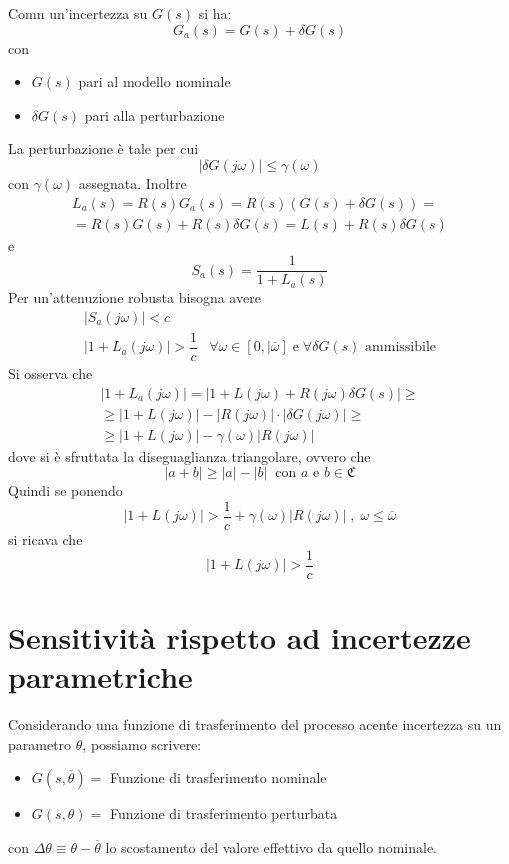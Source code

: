 \documentclass[a4paper]{report}
\begin{document}
Comn un'incertezza su $G(s)$ si ha:
\[
G_a(s) = G(s) + \delta G(s)
\]
con
\begin{itemize}
\item $G(s)$ pari al modello nominale
\item $\delta G(s)$ pari alla perturbazione
\end{itemize}
La perturbazione \`e tale per cui
\[
|\delta G(j \omega)| \leq \gamma(\omega)
\]
con $\gamma(\omega)$ assegnata. Inoltre
\[
\begin{array}{l}
L_a(s) = R(s) G_a(s) = R(s) (G(s) + \delta G(s)) =\\
= R(s)G(s) + R(s)\delta G(s) = L(s) + R(s)\delta G(s)
\end{array}
\]
e
\[
S_a(s) = \dfrac{1}{1 + L_a(s)}
\]
Per un'attenuzione robusta bisogna avere
\[
\begin{array}{ll}
  |S_a(j \omega)| < c & \\
  |1 + L_a(j \omega)| > \dfrac{1}{c} & \forall \omega \in [0,
  |\overline{\omega}]\;\textrm{e}\;\forall \delta G(s) \textrm{ ammissibile}
\end{array}
\]
Si osserva che
\[
\begin{array}{l}
  |1 + L_a(j \omega)| = |1 + L(j \omega) + R(j \omega) \delta G(s)|
  \geq\\
  \geq |1 + L(j \omega)| - |R(j \omega)|\cdot|\delta G(j \omega)|
  \geq\\
  \geq |1 + L(j \omega)| - \gamma(\omega) |R(j \omega)|
\end{array}
\]
dove si \`e sfruttata la diseguaglianza triangolare, ovvero che
\[
| a + b | \geq |a| - |b| \;\; \textrm{con } a \textrm{ e } b \in
\mathfrak{C}
\]
Quindi se ponendo
\[
|1 + L(j \omega)| > \dfrac{1}{c} + \gamma(\omega) |R(j \omega)| \;,\;
\omega \leq \overline{\omega}
\]
si ricava che
\[
|1 + L(j \omega)| > \dfrac{1}{c}
\]

\section{Sensitivit\`a rispetto ad incertezze parametriche}
Considerando una funzione di trasferimento del processo acente
incertezza su un parametro $\theta$, possiamo scrivere:
\begin{itemize}
\item $G(s, \overline{\theta}) = $ Funzione di trasferimento nominale
\item $G(s, \theta) = $ Funzione di trasferimento perturbata
\end{itemize}
con $\Delta \theta \equiv \theta - \overline{\theta}$ lo scostamento
del valore effettivo da quello nominale.
\end{document}
